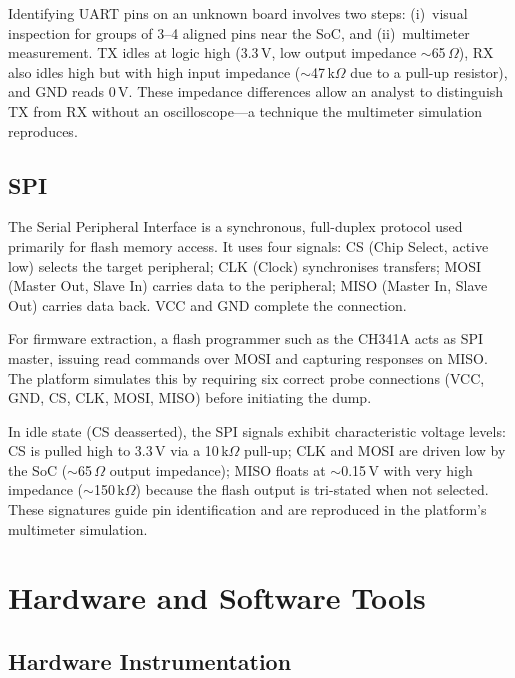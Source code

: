 Identifying UART pins on an unknown board involves two steps: (i)~visual inspection for groups of 3--4 aligned pins near the SoC, and (ii)~multimeter measurement. TX idles at logic high (3.3\,V, low output impedance $\sim$65\,$\Omega$), RX also idles high but with high input impedance ($\sim$47\,k$\Omega$ due to a pull-up resistor), and GND reads 0\,V. These impedance differences allow an analyst to distinguish TX from RX without an oscilloscope---a technique the \pcbctf{} multimeter simulation reproduces.

\subsection{SPI}\label{subsec:spi-protocol}

The Serial Peripheral Interface is a synchronous, full-duplex protocol used primarily for flash memory access. It uses four signals: CS (Chip Select, active low) selects the target peripheral; CLK (Clock) synchronises transfers; MOSI (Master Out, Slave In) carries data to the peripheral; MISO (Master In, Slave Out) carries data back. VCC and GND complete the connection.

For firmware extraction, a flash programmer such as the CH341A acts as SPI master, issuing read commands over MOSI and capturing responses on MISO. The \pcbctf{} platform simulates this by requiring six correct probe connections (VCC, GND, CS, CLK, MOSI, MISO) before initiating the dump.

In idle state (CS deasserted), the SPI signals exhibit characteristic voltage levels: CS is pulled high to 3.3\,V via a 10\,k$\Omega$ pull-up; CLK and MOSI are driven low by the SoC ($\sim$65\,$\Omega$ output impedance); MISO floats at $\sim$0.15\,V with very high impedance ($\sim$150\,k$\Omega$) because the flash output is tri-stated when not selected. These signatures guide pin identification and are reproduced in the platform's multimeter simulation.

\section{Hardware and Software Tools}\label{sec:tools}

\subsection{Hardware Instrumentation}\label{subsec:hw-tools}

